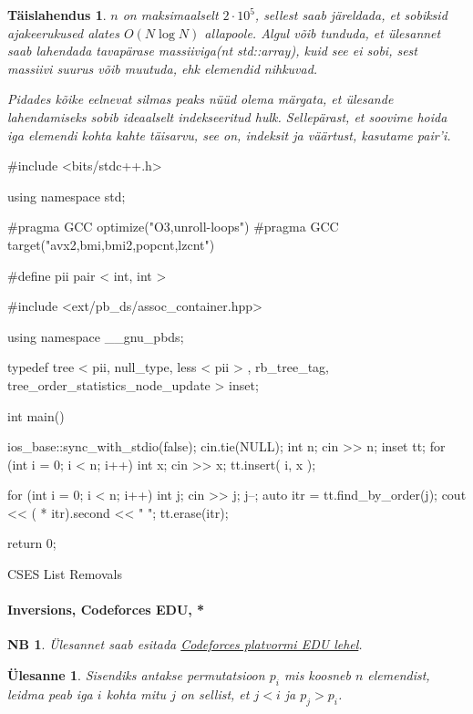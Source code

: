 \documentclass{trkut}
\newtheorem*{extra}{NB}
\newtheorem*{solution}{Täislahendus}
\newtheorem*{Text}{Ülesanne}
\begin{document}
\begin{solution}
$n$ on maksimaalselt $2\cdot 10^5$, sellest saab järeldada, et sobiksid ajakeerukused alates $O(N\log N)$ allapoole.
Algul võib tunduda, et ülesannet saab lahendada tavapärase massiiviga(nt std::array), kuid see ei sobi, sest massiivi suurus võib muutuda, ehk elemendid nihkuvad.

Pidades kõike eelnevat silmas peaks nüüd olema märgata, et ülesande lahendamiseks sobib ideaalselt indekseeritud hulk.
Sellepärast, et soovime hoida iga elemendi kohta kahte täisarvu, see on, indeksit ja väärtust, kasutame pair'i.
\end{solution}
\begin{cclol}    
#include <bits/stdc++.h>

using namespace std;

#pragma GCC optimize("O3,unroll-loops")
#pragma GCC target("avx2,bmi,bmi2,popcnt,lzcnt")

#define pii pair < int, int >

  #include <ext/pb_ds/assoc_container.hpp>

  using namespace __gnu_pbds;

typedef tree < pii, null_type, less < pii > , rb_tree_tag, 
tree_order_statistics_node_update > inset;

int main() {
  ios_base::sync_with_stdio(false);
  cin.tie(NULL);
  int n;
  cin >> n;
  inset tt;
  for (int i = 0; i < n; i++) {
    int x;
    cin >> x;
    tt.insert({
      i,
      x
    });
  }

  for (int i = 0; i < n; i++) {
    int j;
    cin >> j;
    j--;
    auto itr = tt.find_by_order(j);
    cout << ( * itr).second << " ";
    tt.erase(itr);
  }

  return 0;
}
    \end{cclol}
    \begin{kk}[H]
    \caption{CSES List Removals}%
    \end{kk}

\paragraph{Inversions, Codeforces EDU, *}
\begin{extra}
Ülesannet saab esitada \href{https://codeforces.com/edu/course/2/lesson/4/3/practice/contest/274545/problem/A}{Codeforces platvormi EDU lehel}.
\end{extra}
\begin{Text}
Sisendiks antakse permutatsioon $p_i$ mis koosneb $n$ elemendist, leidma peab iga $i$ kohta mitu $j$
on sellist, et $j<i$ ja $p_j > p_i$.

\parencite{24}
\end{Text}
\end{document}
